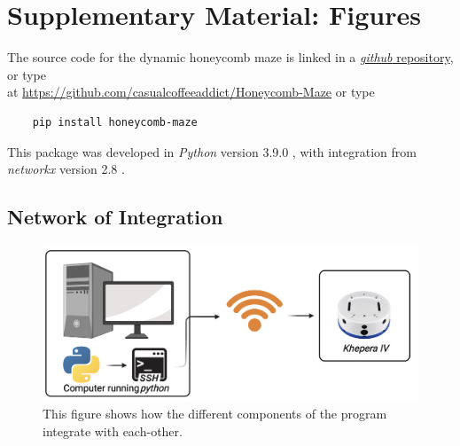 

\newlength\myindent
\setlength\myindent{2em}
\newcommand\bindent{%
  \begingroup
  \setlength{\itemindent}{\myindent}
  \addtolength{\algorithmicindent}{\myindent}
}
\newcommand\eindent{\endgroup}



\appendix
\section{Supplementary Material: Figures}
The source code for the dynamic honeycomb maze is linked in a  \href{https://github.com/casualcoffeeaddict/Honeycomb-Maze}{\textit{github} repository}, or type \\ at \href{https://github.com/casualcoffeeaddict/Honeycomb-Maze}{https://github.com/casualcoffeeaddict/Honeycomb-Maze} or type 
\begin{verbatim}
    pip install honeycomb-maze
\end{verbatim}
This package was developed in \textit{Python} version 3.9.0 \cite{python3}, with integration from \textit{networkx} version 2.8 \cite{networkx}.

\subsection{Network of Integration}
\label{fig:integration_network}
\begin{figure}[H]
    \centering
    \includegraphics[scale = 0.6]{images/intergration_netwwork.png}
    \caption{This figure shows how the different components of the program integrate with each-other.}

\end{figure}


